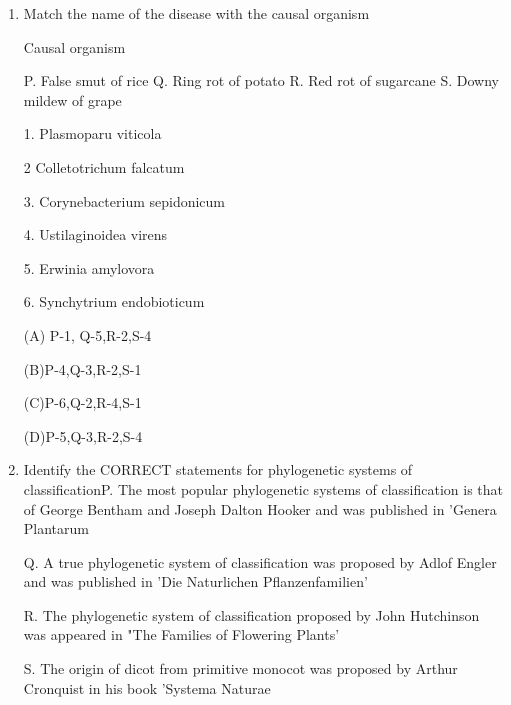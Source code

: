\documentclass[journal]{IEEEtran}
\begin{document}
\begin{enumerate}
\begin{minipage}{0.5\textwidth}
\begin{flushright}
		\end{flushright}
		\end{minipage}
(A)P-4,Q-3,R-5,S-2

(B)P-2,Q-3,R-6,S-1

(C)P-4,Q-2,R-1,S-3

(D)P-3,Q-2,R-2,S-5

\item {Match the name of the disease with the causal organism}
\begin{minipage}{0.5\textwidth}
	\begin{flushleft}
Causal organism

P. False smut of rice
Q. Ring rot of potato
R. Red rot of sugarcane
S. Downy mildew of grape



		\end{flushleft}
		\end{minipage}
	\begin{minipage}{0.5\textwidth}
		\begin{flushright}

1. Plasmoparu viticola


2 Colletotrichum falcatum


3. Corynebacterium sepidonicum


4. Ustilaginoidea virens

5. Erwinia amylovora

6. Synchytrium endobioticum
		\end{flushright}
		\end{minipage}


(A) P-1, Q-5,R-2,S-4

(B)P-4,Q-3,R-2,S-1

(C)P-6,Q-2,R-4,S-1

(D)P-5,Q-3,R-2,S-4


\item {Identify the CORRECT statements for phylogenetic systems of classificationP. The most popular phylogenetic systems of classification is that of George Bentham and Joseph Dalton Hooker and was published in 'Genera Plantarum

Q. A true phylogenetic system of classification was proposed by Adlof Engler and was published in 'Die Naturlichen Pflanzenfamilien'

R. The phylogenetic system of classification proposed by John Hutchinson was appeared in "The Families of Flowering Plants'

S. The origin of dicot from primitive monocot was proposed by Arthur Cronquist in his book 'Systema Naturae

}
\end{enumerate}
\end{document}
